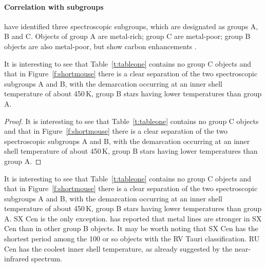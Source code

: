 \documentclass[useAMS,usenatbib]{biom}
\begin{document}
\paragraph{Correlation with subgroups}%
\citet{b20} have identified three spectroscopic subgroups, which
are designated as groups A, B and C. Objects of group A are
metal-rich; group C are metal-poor; group B objects are also
metal-poor, but  show carbon enhancements \citep{b20,b14,b4,b1}.\vspace*{-6pt}
\begin{theorem}
It is interesting to see that Table~\ref{t:tableone} contains no group
C objects and that in Figure~\ref{f:shortmouse} there is a clear
separation of the two spectroscopic subgroups A and B, with the
demarcation occurring at an inner shell temperature of about 450$\,$K,
group B stars having lower temperatures than group A.
\end{theorem}
\begin{proof}
It is interesting to see that Table~\ref{t:tableone} contains no group
C objects and that in Figure~\ref{f:shortmouse} there is a clear
separation of the two spectroscopic subgroups A and B, with the
demarcation occurring at an inner shell temperature of about 450$\,$K,
group B stars having lower temperatures than group A.
\end{proof}
It is interesting to see that Table~\ref{t:tableone} contains no group
C objects and that in Figure~\ref{f:shortmouse} there is a clear
separation of the two spectroscopic subgroups A and B, with the
demarcation occurring at an inner shell temperature of about 450$\,$K,
group B stars having lower temperatures than group A. SX Cen is the
only exception. \citet{b14} has reported that metal lines are stronger
in SX Cen than in other group B objects. It may be worth noting that
SX Cen has the shortest period among the 100 or so objects with the RV
Tauri classification. RU Cen has the coolest inner shell temperature,
as already suggested by the near-infrared spectrum\break \citep{b6}.
\end{document}
